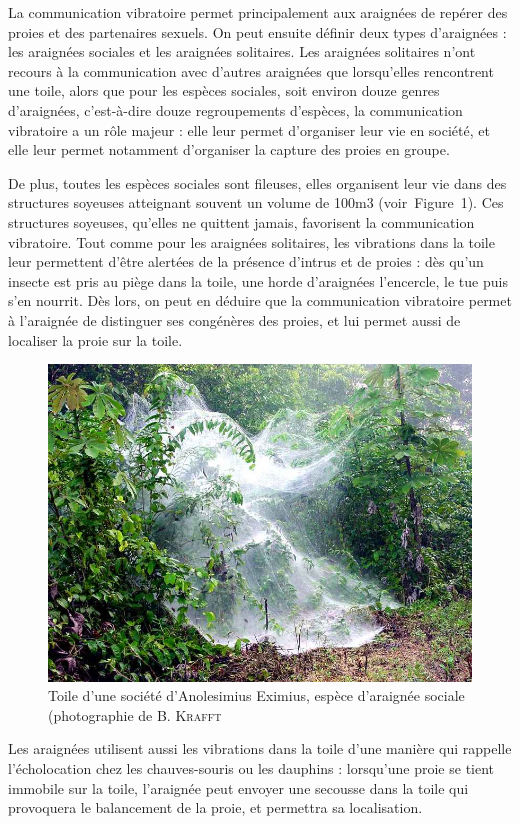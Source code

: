 La communication vibratoire permet principalement aux araignées de
repérer des proies et des partenaires sexuels. On peut ensuite définir
deux types d'araignées : les araignées sociales et les araignées
solitaires. Les araignées solitaires n'ont recours à la communication
avec d'autres araignées que lorsqu'elles rencontrent une toile, alors
que pour les espèces sociales, soit environ douze genres d'araignées,
c'est-à-dire douze regroupements d'espèces, la communication vibratoire
a un rôle majeur : elle leur permet d'organiser leur vie en société, et
elle leur permet notamment d'organiser la capture des proies en groupe.

De plus, toutes les espèces sociales sont fileuses, elles organisent
leur vie dans des structures soyeuses atteignant souvent un volume de
100m3 (voir~Figure~1). Ces structures soyeuses, qu'elles ne quittent
jamais, favorisent la communication vibratoire. Tout comme pour les
araignées solitaires, les vibrations dans la toile leur permettent
d'être alertées de la présence d'intrus et de proies : dès qu'un insecte
est pris au piège dans la toile, une horde d'araignées l'encercle, le
tue puis s'en nourrit. Dès lors, on peut en déduire que la communication
vibratoire permet à l'araignée de distinguer ses congénères des proies,
et lui permet aussi de localiser la proie sur la toile.

\begin{figure}[htb!]
	\centering
	\includegraphics[width=0.7\linewidth]{../img/vibrations/toileSociale}
	\caption{Toile d'une société d'Anolesimius Eximius, espèce
		d'araignée sociale (photographie de B. \textsc{Krafft}}
	\label{fig:toileSociale}
\end{figure}


Les araignées utilisent aussi les vibrations dans la toile d'une manière
qui rappelle l'écholocation chez les chauves-souris ou les dauphins :
lorsqu'une proie se tient immobile sur la toile, l'araignée peut envoyer
une secousse dans la toile qui provoquera le balancement de la proie, et
permettra sa localisation.

